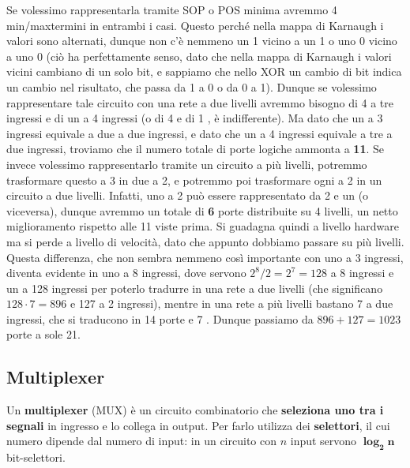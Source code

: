 \documentclass[11pt, a4paper, titlepage, oneside]{scrbook}
\begin{document}
Se volessimo rappresentarla tramite SOP o POS minima avremmo 4 min/maxtermini in entrambi i casi. Questo perché nella mappa di Karnaugh i valori sono alternati, dunque non c'è nemmeno un 1 vicino a un 1 o uno 0 vicino a uno 0 (ciò ha perfettamente senso, dato che nella mappa di Karnaugh i valori vicini cambiano di un solo bit, e sappiamo che nello XOR un cambio di bit indica un cambio nel risultato, che passa da 1 a 0 o da 0 a 1). Dunque se volessimo rappresentare tale circuito con una rete a due livelli avremmo bisogno di 4  a tre ingressi e di un  a 4 ingressi (o di 4  e di 1 , è indifferente). Ma dato che un  a 3 ingressi equivale a due  a due ingressi, e dato che un  a 4 ingressi equivale a tre  a due ingressi, troviamo che il numero totale di porte logiche ammonta a \textbf{11}. Se invece volessimo rappresentarlo tramite un circuito a più livelli, potremmo trasformare questo  a 3 in due  a 2, e potremmo poi trasformare ogni  a 2 in un circuito a due livelli. Infatti, uno  a 2 può essere rappresentato da 2  e un  (o viceversa), dunque avremmo un totale di \textbf{6} porte distribuite su 4 livelli, un netto miglioramento rispetto alle 11 viste prima. Si guadagna quindi a livello hardware ma si perde a livello di velocità, dato che appunto dobbiamo passare su più livelli. Questa differenza, che non sembra nemmeno così importante con uno  a 3 ingressi, diventa evidente in uno  a 8 ingressi, dove servono $2^8/2 = 2^7 = 128$  a 8 ingressi e un  a 128 ingressi per poterlo tradurre in una rete a due livelli (che significano $128 \cdot 7 = 896$  e 127  a 2 ingressi), mentre in una rete a più livelli bastano 7  a due ingressi, che si traducono in 14 porte  e 7 . Dunque passiamo da $896 + 127 = 1023$ porte a sole 21.

\subsection{Multiplexer}

\begin{Definizione}[Multiplexer]
\label{def-multiplexer}
Un \textbf{multiplexer} (MUX) è un circuito combinatorio che \textbf{seleziona uno tra i segnali} in ingresso e lo collega in output. Per farlo utilizza dei \textbf{selettori}, il cui numero dipende dal numero di input: in un circuito con $n$ input servono $\bm{\log_2 n}$ bit-selettori.
\end{Definizione}
\end{document}
